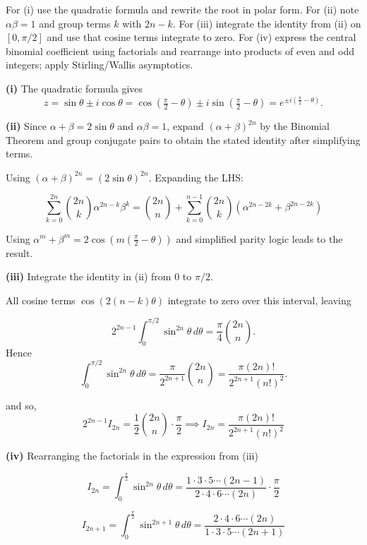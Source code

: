 \begin{hint}
For (i) use the quadratic formula and rewrite the root in polar form. 
For (ii) note $\alpha\beta=1$ and group terms $k$ with $2n-k$. 
For (iii) integrate the identity from (ii) on $[0,\pi/2]$ and use that cosine terms integrate to zero. 
For (iv) express the central binomial coefficient using factorials and rearrange 
into products of even and odd integers; apply Stirling/Wallis asymptotics.
\end{hint}

\begin{solution}
	\textbf{(i)} The quadratic formula gives
\[z=\sin\theta\pm i\cos\theta=\cos\left(\tfrac{\pi}{2}-\theta\right)\pm i\sin\left(\tfrac{\pi}{2}-\theta\right)=e^{\pm i(\frac{\pi}{2}-\theta)}.
\]

	\textbf{(ii)} Since $\alpha+\beta=2\sin\theta$ and $\alpha\beta=1$, expand $(\alpha+\beta)^{2n}$ by the Binomial Theorem and group conjugate pairs to obtain the stated identity after simplifying terms.

    Using $(\alpha+\beta)^{2n} = (2\sin\theta)^{2n}$. 
    Expanding the LHS:
    
    $$\sum_{k=0}^{2n} \binom{2n}{k} \alpha^{2n-k}\beta^k 
    = \binom{2n}{n} + \sum_{k=0}^{n-1} \binom{2n}{k}(\alpha^{2n-2k} + \beta^{2n-2k})$$
    
    Using $\alpha^{m} + \beta^{m} = 2\cos(m(\frac{\pi}{2}-\theta))$ 
    and simplified parity logic leads to the result.

	\textbf{(iii)} Integrate the identity in (ii) from $0$ to $\pi/2$. 
    
    All cosine terms $\cos(2(n-k)\theta)$ integrate to zero over this interval, leaving
    
    \[2^{2n-1}\int_0^{\pi/2}\sin^{2n}\theta\,d\theta = \frac{\pi}{4}\binom{2n}{n}.
    \]
    Hence
    \[\int_0^{\pi/2}\sin^{2n}\theta\,d\theta = \frac{\pi}{2^{2n+1}}\binom{2n}{n} = \frac{\pi(2n)!}{2^{2n+1}(n!)^2}.
    \]

    and so,
    $$2^{2n-1} I_{2n} = \frac{1}{2}\binom{2n}{n} \cdot \frac{\pi}{2} \implies I_{2n} = \frac{\pi (2n)!}{2^{2n+1} (n!)^2}$$

	\textbf{(iv)} 
    Rearranging the factorials in the expression from (iii) 

    $$I_{2n} = \int_0^{\frac{\pi}{2}} \sin^{2n}\theta \, d\theta = \frac{1 \cdot 3 \cdot 5 \cdots (2n-1)}{2 \cdot 4 \cdot 6 \cdots (2n)} \cdot \frac{\pi}{2}$$

    $$I_{2n+1} = \int_0^{\frac{\pi}{2}} \sin^{2n+1}\theta \, d\theta = \frac{2 \cdot 4 \cdot 6 \cdots (2n)}{1 \cdot 3 \cdot 5 \cdots (2n+1)}$$


\end{solution}
